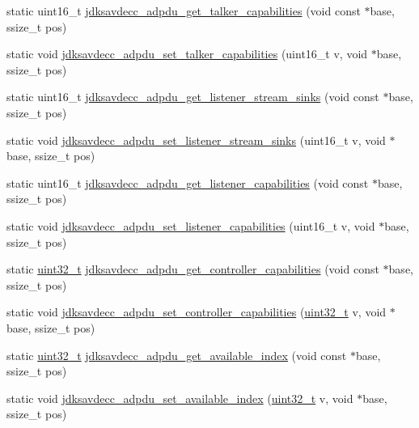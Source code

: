 \begin{DoxyCompactItemize}
\item 
static uint16\+\_\+t \hyperlink{group__adpdu_ga034c04ebeb64d4980b271fb9f9457105}{jdksavdecc\+\_\+adpdu\+\_\+get\+\_\+talker\+\_\+capabilities} (void const $\ast$base, ssize\+\_\+t pos)
\item 
static void \hyperlink{group__adpdu_ga5f3e3ff9e1bb5039cf83ff024b8d3b2f}{jdksavdecc\+\_\+adpdu\+\_\+set\+\_\+talker\+\_\+capabilities} (uint16\+\_\+t v, void $\ast$base, ssize\+\_\+t pos)
\item 
static uint16\+\_\+t \hyperlink{group__adpdu_ga2530e19495f9c53443ddf229d6ff121f}{jdksavdecc\+\_\+adpdu\+\_\+get\+\_\+listener\+\_\+stream\+\_\+sinks} (void const $\ast$base, ssize\+\_\+t pos)
\item 
static void \hyperlink{group__adpdu_ga5e4e240b114ca3a2be04a806e2c515e2}{jdksavdecc\+\_\+adpdu\+\_\+set\+\_\+listener\+\_\+stream\+\_\+sinks} (uint16\+\_\+t v, void $\ast$base, ssize\+\_\+t pos)
\item 
static uint16\+\_\+t \hyperlink{group__adpdu_gae53a0c90e1f5cafa6639cbddacdfb180}{jdksavdecc\+\_\+adpdu\+\_\+get\+\_\+listener\+\_\+capabilities} (void const $\ast$base, ssize\+\_\+t pos)
\item 
static void \hyperlink{group__adpdu_ga8ac520cff2dc184f6b03c0253a851ac9}{jdksavdecc\+\_\+adpdu\+\_\+set\+\_\+listener\+\_\+capabilities} (uint16\+\_\+t v, void $\ast$base, ssize\+\_\+t pos)
\item 
static \hyperlink{parse_8c_a6eb1e68cc391dd753bc8ce896dbb8315}{uint32\+\_\+t} \hyperlink{group__adpdu_ga6c8b9d1301ebb8e43869704497af73bc}{jdksavdecc\+\_\+adpdu\+\_\+get\+\_\+controller\+\_\+capabilities} (void const $\ast$base, ssize\+\_\+t pos)
\item 
static void \hyperlink{group__adpdu_ga9d15795ea7ee0739da8559090662069a}{jdksavdecc\+\_\+adpdu\+\_\+set\+\_\+controller\+\_\+capabilities} (\hyperlink{parse_8c_a6eb1e68cc391dd753bc8ce896dbb8315}{uint32\+\_\+t} v, void $\ast$base, ssize\+\_\+t pos)
\item 
static \hyperlink{parse_8c_a6eb1e68cc391dd753bc8ce896dbb8315}{uint32\+\_\+t} \hyperlink{group__adpdu_ga9572ceadb76cad6c051e5ab2672553c1}{jdksavdecc\+\_\+adpdu\+\_\+get\+\_\+available\+\_\+index} (void const $\ast$base, ssize\+\_\+t pos)
\item 
static void \hyperlink{group__adpdu_ga05b3c0d4bfedfb7ca01d24a206619c69}{jdksavdecc\+\_\+adpdu\+\_\+set\+\_\+available\+\_\+index} (\hyperlink{parse_8c_a6eb1e68cc391dd753bc8ce896dbb8315}{uint32\+\_\+t} v, void $\ast$base, ssize\+\_\+t pos)
\item 

\end{DoxyCompactItemize}
